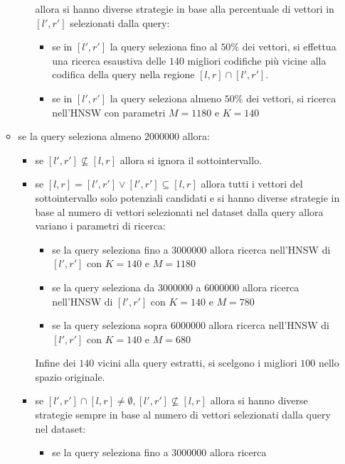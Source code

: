 \begin{itemize}
\begin{itemize}
\begin{itemize}
            allora si hanno diverse strategie in base alla percentuale di vettori in $[l',r']$ 
            selezionati dalla query:
            \begin{itemize}
                \item se in $[l',r']$ la query seleziona fino al $50\%$ dei vettori,
                si effettua una ricerca esaustiva delle $140$ migliori codifiche 
                più vicine alla codifica della query nella regione $[l,r] \cap [l',r']$.
                \item se in $[l',r']$ la query seleziona almeno $50\%$ dei vettori,
                si ricerca nell'HNSW con parametri $M=1180$ e $K=140$
            \end{itemize} 
        \end{itemize}
        \item se la query seleziona almeno $2000000$ allora:
        \begin{itemize}
            \item se $[l',r'] \not \subseteq [l,r]$ allora si ignora il sottointervallo.
            \item se $[l,r] = [l',r'] \lor  [l',r'] \subseteq [l,r]$ allora 
            tutti i vettori del sottointervallo solo potenziali candidati e si 
            hanno diverse strategie in base al numero di vettori selezionati nel 
            dataset dalla query allora variano i parametri di ricerca:
            \begin{itemize}
                \item se la query seleziona fino a $3000000$ allora ricerca 
                nell'HNSW di $[l',r']$ con $K=140$ e $M=1180$
                \item se la query seleziona da $3000000$ a $6000000$ allora ricerca 
                nell'HNSW di $[l',r']$ con $K=140$ e $M=780$
                \item se la query seleziona sopra $6000000$ allora ricerca 
                nell'HNSW di $[l',r']$ con $K=140$ e $M=680$
            \end{itemize}
            Infine dei $140$ vicini alla query estratti, si scelgono i migliori $100$ 
            nello spazio originale.
            \item se $[l',r'] \cap [l,r] \ne \emptyset, [l',r'] \not \subseteq [l,r]$ 
            allora si hanno diverse strategie sempre in base al numero di vettori 
            selezionati dalla query nel dataset:
            \begin{itemize}
                \item se la query seleziona fino a $3000000$ allora ricerca 

\end{itemize}
\end{itemize}
\end{itemize}
\end{itemize}
